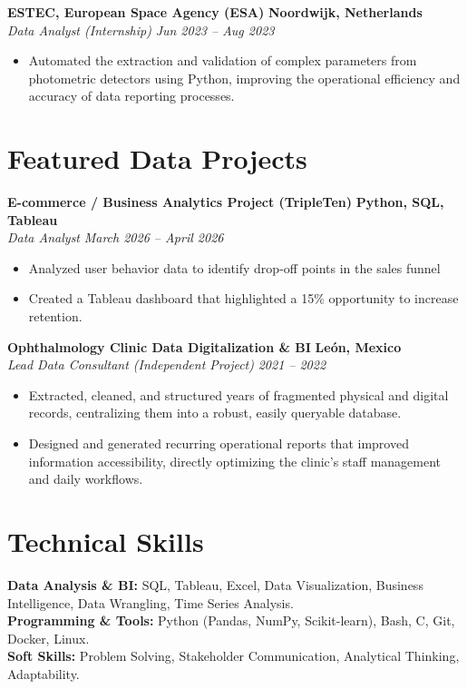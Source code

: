 \documentclass[10pt,a4paper]{article}
\begin{document}
\textbf{ESTEC, European Space Agency (ESA)} \hfill \textbf{Noordwijk, Netherlands}\\
\textit{Data Analyst (Internship)}  \hfill \textit{Jun 2023 -- Aug 2023}
\begin{itemize}[leftmargin=1.5em]
    \item Automated the extraction and validation of complex parameters from photometric detectors using Python, improving the operational efficiency and accuracy of data reporting processes.
\end{itemize}

\section*{Featured Data Projects}
\textbf{E-commerce / Business Analytics Project (TripleTen)} \hfill \textbf{Python, SQL, Tableau} \\
\textit{Data Analyst} \hfill \textit{March 2026 -- April 2026}
\begin{itemize}[leftmargin=1.5em]
    \item Analyzed user behavior data to identify drop-off points in the sales funnel
    \item Created a Tableau dashboard that highlighted a 15\% opportunity to increase retention.
\end{itemize}

\textbf{Ophthalmology Clinic Data Digitalization \& BI} \hfill \textbf{León, Mexico} \\
\textit{Lead Data Consultant (Independent Project)} \hfill \textit{2021 -- 2022}
\begin{itemize}[leftmargin=1.5em]
    \item Extracted, cleaned, and structured years of fragmented physical and digital records, centralizing them into a robust, easily queryable database.
    \item Designed and generated recurring operational reports that improved information accessibility, directly optimizing the clinic's staff management and daily workflows.
\end{itemize}

\section*{Technical Skills}
\textbf{Data Analysis \& BI:} SQL, Tableau, Excel, Data Visualization, Business Intelligence, Data Wrangling, Time Series Analysis. \\
\textbf{Programming \& Tools:} Python (Pandas, NumPy, Scikit-learn), Bash, C, Git, Docker, Linux. \\
\textbf{Soft Skills:} Problem Solving, Stakeholder Communication, Analytical Thinking, Adaptability.
\end{document}
